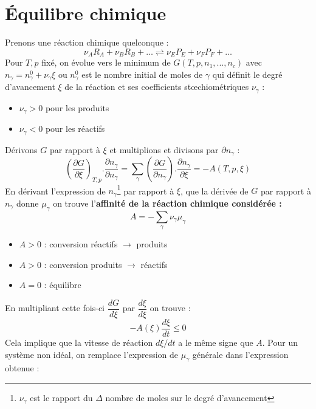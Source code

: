\documentclass[11pt, a4paper, openany]{book}
\begin{document}
\section{Équilibre chimique}
Prenons une réaction chimique quelconque : 
\begin{equation}
\nu_A R_A + \nu_B R_B + \dots \rightleftharpoons \nu_E P_E + \nu_F P_F + \dots
\end{equation}
Pour $T, p$ fixé, on évolue vers le minimum de $G(T,p,n_1, ..., n_c)$ avec $n_\gamma = n_\gamma^0 + \nu_\gamma\xi$ ou $n_\gamma^0$ est le nombre initial de moles de $\gamma$ qui définit le degré d'avancement $\xi$ de la réaction et ses coefficients stœchiométriques $\nu_\gamma$ :
\begin{itemize}
\item $\nu_\gamma > 0$ pour les produits
\item $\nu_\gamma < 0$ pour les réactifs
\end{itemize}
Dérivons $G$ par rapport à $\xi$ et multiplions et divisons par $\partial n_\gamma$ :
\begin{equation}
\left(\frac{\partial G}{\partial\xi}\right)_{T,p} . \frac{\partial n_\gamma}{\partial n_\gamma} = \sum_\gamma \left(\frac{\partial G}{\partial n_\gamma}\right).\frac{\partial n_\gamma}{\partial\xi} = -A(T,p,\xi)
\end{equation}
En dérivant l'expression de $n_\gamma$\footnote{$\nu_\gamma$ est le rapport du $\Delta$ nombre de moles sur le degré d'avancement} par rapport à $\xi$, que la dérivée de $G$ par rapport à $n_\gamma$ donne $\mu_\gamma$ on trouve l'\textbf{affinité de la réaction chimique considérée :}
\begin{equation}
A = - \sum_\gamma \nu_\gamma \mu_\gamma
\end{equation}
\begin{itemize}
\item $A > 0$ : conversion réactifs $\rightarrow$ produits
\item $A > 0$ : conversion produits $\rightarrow$ réactifs
\item $A = 0$ : équilibre
\end{itemize}
En multipliant cette fois-ci $\dfrac{dG}{d\xi}$ par $\dfrac{d\xi}{d\xi}$ on trouve :
\begin{equation}
-A(\xi)\frac{d\xi}{dt} \leq 0
\end{equation}
Cela implique que la vitesse de réaction $d\xi/dt$ a le même signe que $A$. Pour un système non idéal, on remplace l'expression de $\mu_\gamma$ générale dans l'expression obtenue :
\end{document}
